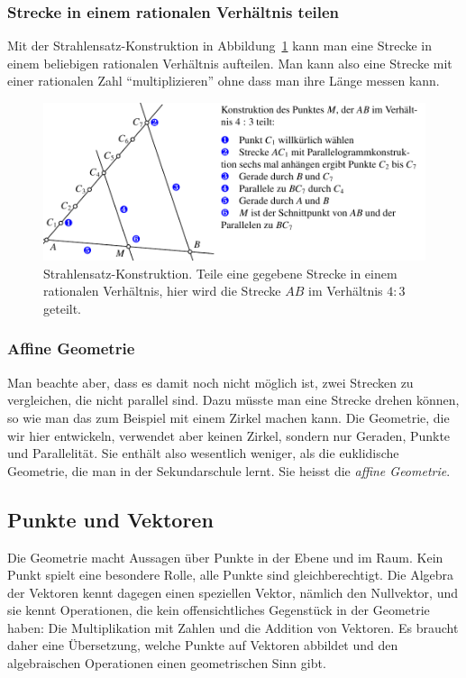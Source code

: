 \subsubsection{Strecke in einem rationalen Verhältnis teilen}
Mit der Strahlensatz-Konstruktion in
Abbildung~\ref{skript:affin:strahlensatz}
kann man eine Strecke in einem beliebigen rationalen Verhältnis aufteilen.
Man kann also eine Strecke mit einer rationalen Zahl ``multiplizieren''
ohne dass man ihre Länge messen kann.
\begin{figure}
\centering
\includegraphics{3/images/strahlensatz.pdf}
\caption{Strahlensatz-Konstruktion. 
Teile eine gegebene Strecke in einem rationalen Verhältnis, hier wird
die Strecke $AB$ im Verhältnis $4:3$ geteilt.
\label{skript:affin:strahlensatz}}
\end{figure}

\subsubsection{Affine Geometrie}
Man beachte aber, dass es damit noch nicht möglich ist, zwei Strecken
zu vergleichen, die nicht parallel sind.
Dazu müsste man eine Strecke drehen können, so wie man das zum Beispiel
mit einem Zirkel machen kann.
Die Geometrie, die wir hier entwickeln, verwendet aber keinen Zirkel,
sondern nur Geraden, Punkte und Parallelität.
Sie enthält also wesentlich weniger, als die euklidische Geometrie, die
man in der Sekundarschule lernt.
Sie heisst die {\em affine Geometrie}.

%
%
\subsection{Punkte und Vektoren}
Die Geometrie macht Aussagen über Punkte in der Ebene und im Raum.
Kein Punkt spielt eine besondere Rolle, alle Punkte sind gleichberechtigt.
Die Algebra der Vektoren kennt dagegen einen speziellen Vektor,
nämlich den Nullvektor, und sie kennt Operationen, die kein offensichtliches
Gegenstück in der Geometrie haben: Die Multiplikation mit Zahlen und
die Addition von Vektoren.
Es braucht daher eine Übersetzung, welche Punkte auf Vektoren
abbildet und den algebraischen Operationen einen geometrischen
Sinn gibt.

